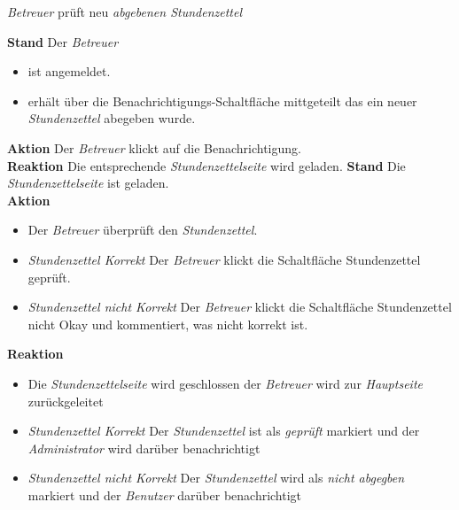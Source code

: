 \begin{requirements}
	 \emph{Betreuer} prüft neu \emph{abgebenen Stundenzettel}
	\begin{requirements}
	        \textbf{Stand} Der \emph{Betreuer}
	            \begin{itemize}
	                \item ist angemeldet.
	                \item erhält über die Benachrichtigungs-Schaltfläche mittgeteilt das ein neuer \emph{Stundenzettel} abegeben wurde.
	            \end{itemize}
            \textbf{Aktion} Der \emph{Betreuer} klickt auf die Benachrichtigung. \\
            \textbf{Reaktion} Die entsprechende \emph{Stundenzettelseite} wird  geladen.
	        \textbf{Stand} Die \emph{Stundenzettelseite} ist geladen. \\
            \textbf{Aktion}
                \begin{itemize}
                    \item Der \emph{Betreuer} überprüft den \emph{Stundenzettel}.
                    \item \textit{Stundenzettel Korrekt} Der \emph{Betreuer} klickt die Schaltfläche Stundenzettel geprüft.
                    \item \textit{Stundenzettel nicht Korrekt}  Der \emph{Betreuer} klickt die Schaltfläche Stundenzettel nicht Okay und kommentiert, was nicht korrekt ist.
                \end{itemize}
            \textbf{Reaktion}
                \begin{itemize}
                    \item Die \emph{Stundenzettelseite} wird geschlossen der \emph{Betreuer} wird zur \emph{Hauptseite} zurückgeleitet
                    \item \textit{Stundenzettel Korrekt} Der \emph{Stundenzettel} ist als \emph{geprüft} markiert und der \emph{Administrator} wird darüber benachrichtigt
                    \item \textit{Stundenzettel nicht Korrekt} Der \emph{Stundenzettel} wird als \emph{nicht abgegben} markiert und der \emph{Benutzer} darüber benachrichtigt
                \end{itemize}
	\end{requirements}


\end{requirements}
